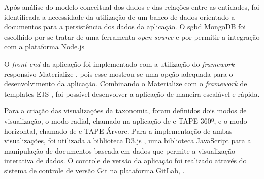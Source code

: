 \par
Após análise do modelo conceitual dos dados e das relações entre as entidades, foi identificada a necessidade da utilização de um banco de dados orientado a documentos para a 
persistência dos dados da aplicação. 
O \acrfull{sgbd} MongoDB foi escolhido por se tratar de uma ferramenta \textit{open source} e por permitir a integração com a plataforma Node.js 
\cite{mongodb}

\par
O \textit{front-end} da aplicação foi implementado com a utilização do \textit{framework} responsivo Materialize \cite{materialize}, pois esse mostrou-se uma opção adequada para o desenvolvimento da aplicação. Combinando o Materialize com o \textit{framework} de templates EJS \cite{ejs}, 
foi possível desenvolver a aplicação de maneira escalável e rápida. 


\par
Para a criação das visualizações da taxonomia, foram definidos dois modos de visualização, o modo radial, chamado na aplicação de e-TAPE 360º, e o modo horizontal, 
chamado de e-TAPE Árvore. Para a implementação de ambas visualizações, foi utilizada a biblioteca D3.js \cite{d3js}, uma biblioteca JavaScript para a manipulação de documentos 
baseada em dados que permite a visualização interativa de dados. 
O controle de versão da aplicação foi realizado através do sistema de controle de versão Git na plataforma GitLab, \cite{gitlab}.
